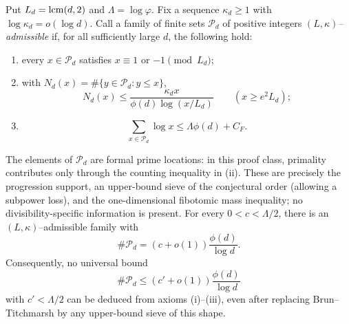 \begin{theorem}
\label{thm:sieve-mass-barrier}
Put $L_d=\mathop{\rm lcm}(d,2)$ and $\Lambda=\log\varphi$.  Fix a
sequence $\kappa_d\geq1$ with $\log\kappa_d=o(\log d)$.  Call a family of
finite sets $\mathcal P_d$ of positive integers \emph{$(L,\kappa)$--admissible}
if, for all sufficiently large $d$, the following hold:
\begin{enumerate}[label=\textup{(\roman*)}]
\item every $x\in\mathcal P_d$ satisfies $x\equiv1$ or $-1\pmod{L_d}$;
\item with $N_d(x)=\#\{y\in\mathcal P_d:y\leq x\}$,
\[
 N_d(x)\leq
 \frac{\kappa_d x}{\phi(d)\log(x/L_d)}
 \qquad(x\geq e^2L_d);
\]
\item
\[
 \sum_{x\in\mathcal P_d}\log x\leq\Lambda\phi(d)+C_F.
\]
\end{enumerate}
The elements of $\mathcal P_d$ are formal prime locations: in this proof
class, primality contributes only through the counting inequality in
\textup{(ii)}.  These are precisely the progression support, an upper-bound sieve of the
conjectural order (allowing a subpower loss), and the one-dimensional
fibotomic mass inequality; no divisibility-specific information is present.
For every $0<c<\Lambda/2$, there is an $(L,\kappa)$--admissible family with
\[
 \#\mathcal P_d=\left(c+o(1)\right)\frac{\phi(d)}{\log d}.
\]
Consequently, no universal bound
\[
 \#\mathcal P_d\leq\left(c'+o(1)\right)\frac{\phi(d)}{\log d}
\]
with $c'<\Lambda/2$ can be deduced from axioms \textup{(i)}--\textup{(iii)},
even after replacing Brun--Titchmarsh by any upper-bound sieve of this shape.
\end{theorem}

